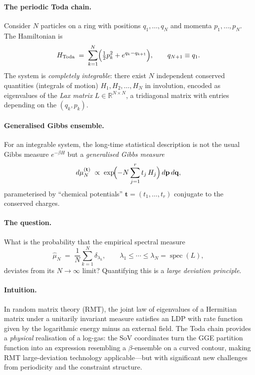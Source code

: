 \documentclass[11pt,a4paper]{article}
\theoremstyle{remark}
\begin{document}
\paragraph{The periodic Toda chain.}
Consider $N$ particles on a ring with positions $q_1,\dots,q_N$ and momenta $p_1,\dots,p_N$.
The Hamiltonian is
\[
  H_{\text{Toda}} \;=\; \sum_{k=1}^{N}\Bigl(\tfrac{1}{2}p_k^2 + e^{q_k - q_{k+1}}\Bigr), \qquad q_{N+1}\equiv q_1.
\]
The system is \emph{completely integrable}: there exist $N$ independent conserved quantities (integrals of motion) $H_1,H_2,\dots,H_N$ in involution, encoded as eigenvalues of the \emph{Lax matrix} $L\in\mathbb{R}^{N\times N}$, a tridiagonal matrix with entries depending on the $(q_k,p_k)$.

\paragraph{Generalised Gibbs ensemble.}
For an integrable system, the long-time statistical description is not the usual Gibbs measure $e^{-\beta H}$ but a \emph{generalised Gibbs measure}
\[
  d\mu_N^{(\mathbf{t})} \;\propto\; \exp\!\Bigl(-N\sum_{j=1}^{r} t_j\, H_j\Bigr)\, d\mathbf{p}\,d\mathbf{q},
\]
parameterised by ``chemical potentials'' $\mathbf{t}=(t_1,\dots,t_r)$ conjugate to the conserved charges.

\paragraph{The question.}
What is the probability that the empirical spectral measure
\[
  \hat\mu_N \;=\; \frac{1}{N}\sum_{k=1}^{N}\delta_{\lambda_k}, \qquad \lambda_1\le\cdots\le\lambda_N = \operatorname{spec}(L),
\]
deviates from its $N\to\infty$ limit?  Quantifying this is a \emph{large deviation principle}.

\paragraph{Intuition.}
In random matrix theory (RMT), the joint law of eigenvalues of a Hermitian matrix under a unitarily invariant measure satisfies an LDP with rate function given by the logarithmic energy minus an external field.  The Toda chain provides a \emph{physical} realisation of a log-gas: the SoV coordinates turn the GGE partition function into an expression resembling a $\beta$-ensemble on a curved contour, making RMT large-deviation technology applicable---but with significant new challenges from periodicity and the constraint structure.
\end{document}
